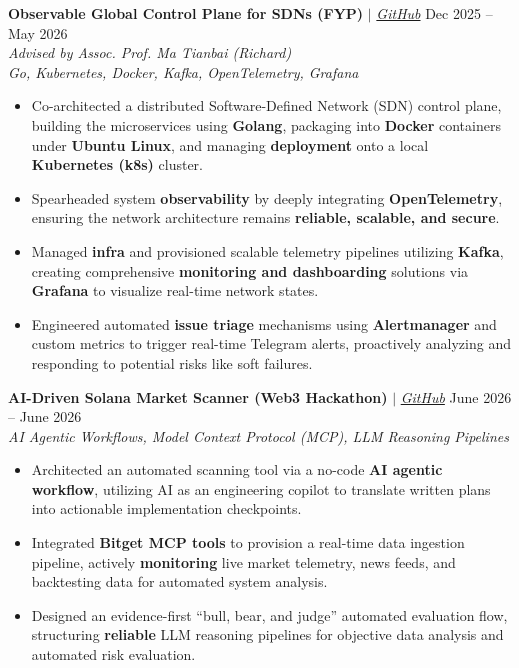 \documentclass[10pt, letterpaper]{article}
\begin{document}
\textbf{Observable Global Control Plane for SDNs (FYP)} $|$
\href{https://github.com/chew01/ixp-gcp/tree/feat/observability}{\textit{GitHub}} \hfill Dec 2025 -- May 2026 \\
\textit{Advised by Assoc. Prof. Ma Tianbai (Richard)} \\
\textit{Go, Kubernetes, Docker, Kafka, OpenTelemetry, Grafana}
\begin{itemize}[leftmargin=0.2in, itemsep=4pt, parsep=2pt, topsep=4pt]
    \item Co-architected a distributed Software-Defined Network (SDN) control plane, building the microservices using \textbf{Golang}, packaging into \textbf{Docker} containers under \textbf{Ubuntu Linux}, and managing \textbf{deployment} onto a local \textbf{Kubernetes (k8s)} cluster.
    \item Spearheaded system \textbf{observability} by deeply integrating \textbf{OpenTelemetry}, ensuring the network architecture remains \textbf{reliable, scalable, and secure}.
    \item Managed \textbf{infra} and provisioned scalable telemetry pipelines utilizing \textbf{Kafka}, creating comprehensive \textbf{monitoring and dashboarding} solutions via \textbf{Grafana} to visualize real-time network states.
    \item Engineered automated \textbf{issue triage} mechanisms using \textbf{Alertmanager} and custom metrics to trigger real-time Telegram alerts, proactively analyzing and responding to potential risks like soft failures.
\end{itemize}
\vspace{8pt}

\textbf{AI-Driven Solana Market Scanner (Web3 Hackathon)} $|$
\href{https://github.com/looikaizhi/meme-ai-agent}{\textit{GitHub}} \hfill June 2026 -- June 2026 \\
\textit{AI Agentic Workflows, Model Context Protocol (MCP), LLM Reasoning Pipelines}
\begin{itemize}[leftmargin=0.2in, itemsep=4pt, parsep=2pt, topsep=4pt]
    \item Architected an automated scanning tool via a no-code \textbf{AI agentic workflow}, utilizing AI as an engineering copilot to translate written plans into actionable implementation checkpoints.
    \item Integrated \textbf{Bitget MCP tools} to provision a real-time data ingestion pipeline, actively \textbf{monitoring} live market telemetry, news feeds, and backtesting data for automated system analysis.
    \item Designed an evidence-first ``bull, bear, and judge'' automated evaluation flow, structuring \textbf{reliable} LLM reasoning pipelines for objective data analysis and automated risk evaluation.
\end{itemize}
\vspace{8pt}
\end{document}
